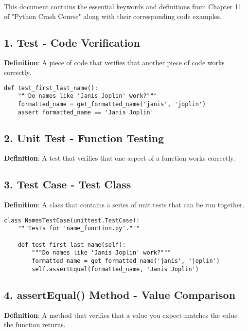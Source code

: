 
This document contains the essential keywords and definitions from Chapter 11 of "Python Crash Course" along with their corresponding code examples.

\subsection*{1. Test - Code Verification}
\textbf{Definition}: A piece of code that verifies that another piece of code works correctly.

\begin{lstlisting}
def test_first_last_name():
    """Do names like 'Janis Joplin' work?"""
    formatted_name = get_formatted_name('janis', 'joplin')
    assert formatted_name == 'Janis Joplin'
\end{lstlisting}

\subsection*{2. Unit Test - Function Testing}
\textbf{Definition}: A test that verifies that one aspect of a function works correctly.



\subsection*{3. Test Case - Test Class}
\textbf{Definition}: A class that contains a series of unit tests that can be run together.

\begin{lstlisting}
class NamesTestCase(unittest.TestCase):
    """Tests for 'name_function.py'."""
    
    def test_first_last_name(self):
        """Do names like 'Janis Joplin' work?"""
        formatted_name = get_formatted_name('janis', 'joplin')
        self.assertEqual(formatted_name, 'Janis Joplin')
\end{lstlisting}

\subsection*{4. assertEqual() Method - Value Comparison}
\textbf{Definition}: A method that verifies that a value you expect matches the value the function returns.


